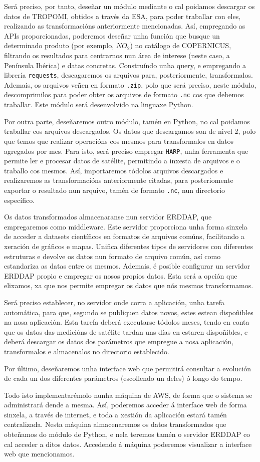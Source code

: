 Será preciso, por tanto, deseñar un módulo  mediante o cal poidamos descargar os datos de TROPOMI, obtidos a través da ESA, para poder traballar con eles, realizando
as transformacións anteriormente mencionadas. Así, empregando as APIs proporcionadas, poderemos deseñar unha función que busque un determinado produto (por exemplo,
$NO_{2}$) no catálogo de COPERNICUS, filtrando os resultados para centrarnos nun área de interese (neste caso, a Península Ibérica) e datas concretas. Construíndo unha
query, e empregando a librería \texttt{requests}, descagaremos os arquivos para, posteriormente, transformalos. Ademais, os arquivos veñen en formato \texttt{.zip}, polo que será
preciso, neste módulo, descomprimilos para poder obter os arquivos de formato \texttt{.nc} cos que debemos traballar. Este módulo será desenvolvido na linguaxe Python.

Por outra parte, deseñaremos outro módulo, tamén en Python, no cal poidamos traballar cos arquivos descargados. Os datos que descargamos son de nivel 2, polo que temos que realizar
operacións cos mesmos para transformalos en datos agregados por mes. Para isto, será preciso empregar \texttt{HARP}, unha ferramenta que permite ler e procesar datos de satélite,
permitindo a inxesta de arquivos e o traballo cos mesmos. Así, importaremos tódolos arquivos descargados e realizaremos as transformacións anteriormente citadas, para posteriomente
exportar o resultado nun arquivo, tamén de formato \texttt{.nc}, nun directorio específico.

Os datos transformados almacenaranse nun servidor ERDDAP, que empregaremos como middleware. Este servidor proporciona unha forma sinxela de acceder a datasets científicos en formatos
de arquivos comúns, facilitando a xeración de gráficos e mapas. Unifica diferentes tipos de servidores con diferentes estruturas e devolve os datos nun formato de arquivo común, así
como estandariza as datas entre os mesmos. Ademais, é posible configurar un servidor ERDDAP propio e empregar os nosos propios datos. Esta será a opción que elixamos, xa que nos permite
empregar os datos que nós mesmos transformamos.

Será preciso establecer, no servidor onde corra a aplicación, unha tarefa automática, para que, segundo se publiquen datos novos, estes estean dispoñibles na nosa aplicación. Esta tarefa
deberá executarse tódolos meses, tendo en conta que os datos das medicións de satélite tardan uns días en estaren dispoñibles, e deberá descargar os datos dos parámetros que empregue a
nosa aplicación, transformalos e almacenalos no directorio establecido.

Por último, deseñaremos unha interface web que permitirá consultar a evolución de cada un dos diferentes parámetros (escollendo un deles) ó longo do tempo.

Todo isto implementarémolo nunha máquina de AWS, de forma que o sistema se administrará dende a mesma. Así, poderemos acceder á interface web de forma sinxela, a través de internet,
e toda a xestión da aplicación estará tamén centralizada. Nesta máquina almacenaremos os datos transformados que obteñamos do módulo de Python, e nela teremos tamén o servidor ERDDAP
co cal acceder a ditos datos. Accedendo á máquina poderemos visualizar a interface web que mencionamos.
